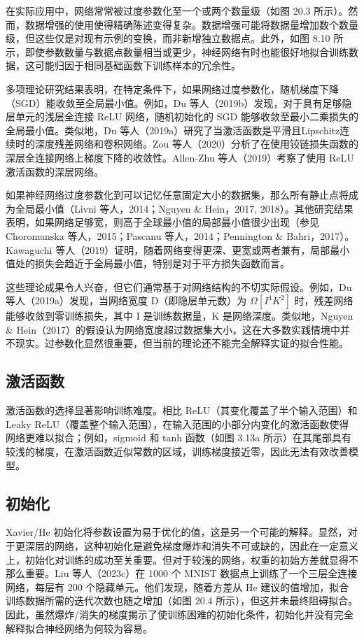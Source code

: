 \documentclass[lang=cn,newtx,10pt,scheme=chinese]{elegantbook}
\begin{document}
在实际应用中，网络常常被过度参数化至一个或两个数量级（如图 20.3 所示）。然而，数据增强的使用使得精确陈述变得复杂。数据增强可能将数据量增加数个数量级，但这些仅是对现有示例的变换，而非新增独立数据点。此外，如图 8.10 所示，即使参数数量与数据点数量相当或更少，神经网络有时也能很好地拟合训练数据，这可能归因于相同基础函数下训练样本的冗余性。

多项理论研究结果表明，在特定条件下，如果网络过度参数化，随机梯度下降（SGD）能收敛至全局最小值。例如，Du 等人（2019b）发现，对于具有足够隐层单元的浅层全连接 ReLU 网络，随机初始化的 SGD 能够收敛至最小二乘损失的全局最小值。类似地，Du 等人（2019a）研究了当激活函数是平滑且Lipschitz连续时的深度残差网络和卷积网络。Zou 等人（2020）分析了在使用铰链损失函数的深层全连接网络上梯度下降的收敛性。Allen-Zhu 等人（2019）考察了使用 ReLU 激活函数的深层网络。

如果神经网络过度参数化到可以记忆任意固定大小的数据集，那么所有静止点将成为全局最小值（Livni 等人，2014；Nguyen \& Hein，2017, 2018）。其他研究结果表明，如果网络足够宽，则高于全球最小值的局部最小值很少出现（参见 Choromanska 等人，2015；Pascanu 等人，2014；Pennington \& Bahri，2017）。Kawaguchi 等人（2019）证明，随着网络变得更深、更宽或两者兼有，局部最小值处的损失会趋近于全局最小值，特别是对于平方损失函数而言。

这些理论成果令人兴奋，但它们通常基于对网络结构的不切实际假设。例如，Du 等人（2019a）发现，当网络宽度 D（即隐层单元数）为 \(\Omega [I^4K^2]\) 时，残差网络能够收敛到零训练损失，其中 I 是训练数据量，K 是网络深度。类似地，Nguyen \& Hein（2017）的假设认为网络宽度超过数据集大小，这在大多数实践情境中并不现实。过参数化显然很重要，但当前的理论还不能完全解释实证的拟合性能。

\subsection{激活函数}
激活函数的选择显著影响训练难度。相比 ReLU（其变化覆盖了半个输入范围）和 Leaky ReLU（覆盖整个输入范围），在输入范围的小部分内变化的激活函数使得网络更难以拟合；例如，sigmoid 和 tanh 函数（如图 3.13a 所示）在其尾部具有较浅的梯度，在激活函数近似常数的区域，训练梯度接近零，因此无法有效改善模型。

\subsection{初始化}
Xavier/He 初始化将参数设置为易于优化的值，这是另一个可能的解释。显然，对于更深层的网络，这种初始化是避免梯度爆炸和消失不可或缺的，因此在一定意义上，初始化对训练的成功至关重要。但对于较浅的网络，权重的初始方差就显得不那么重要。Liu 等人（2023c）在 1000 个 MNIST 数据点上训练了一个三层全连接网络，每层有 200 个隐藏单元。他们发现，随着方差从 He 建议的值增加，拟合训练数据所需的迭代次数也随之增加（如图 20.4 所示），但这并未最终阻碍拟合。因此，虽然爆炸/消失的梯度揭示了使训练困难的初始化条件，初始化并没有完全解释拟合神经网络为何较为容易。
\end{document}
